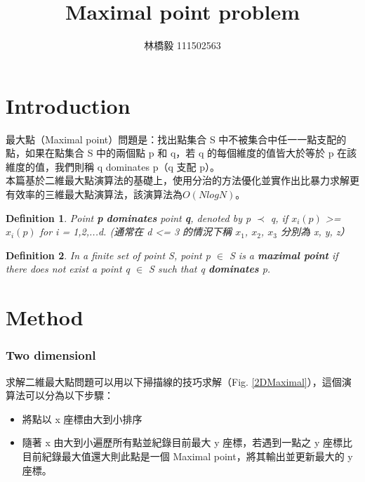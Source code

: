 \documentclass[12pt]{article}
\title{Maximal point problem}
\author{林橋毅 111502563}
\newtheorem{definition}{Definition}
\begin{document}
\maketitle

\part{Introduction}
最大點（Maximal point）問題是：找出點集合 S 中不被集合中任一一點支配的點，如果在點集合 S 中的兩個點 p 和 q，若 q 的每個維度的值皆大於等於 p 在該維度的值，我們則稱 q dominates p（q 支配 p）。\\

本篇基於二維最大點演算法的基礎上，使用分治的方法優化並實作出比暴力求解更有效率的三維最大點演算法，該演算法為$O(NlogN)$。

\begin{definition}
	Point \textbf{p} \textbf{dominates} point \textbf{q}, denoted by p $\prec$ q, if $x_i(p)$ >= $x_i(p)$ for i = 1,2,...d. (通常在 d <= 3 的情況下稱 $x_1$, $x_2$, $x_3$ 分別為 x, y, z）
\end{definition}

\begin{definition}
In a finite set of point S, point p $\in$ S is a \textbf{maximal point} if there does not exist a point q $\in$ S such that q \textbf{dominates} p.
\end{definition}


\part{Method}

\section{Two dimensionl}
求解二維最大點問題可以用以下掃描線的技巧求解（Fig. \ref{2DMaximal}），這個演算法可以分為以下步驟：
\begin{itemize}
	\item 將點以 x 座標由大到小排序
	\item 隨著 x 由大到小遍歷所有點並紀錄目前最大 y 座標，若遇到一點之 y 座標比目前紀錄最大值還大則此點是一個 Maximal point，將其輸出並更新最大的 y 座標。
\end{itemize}
\end{document}
